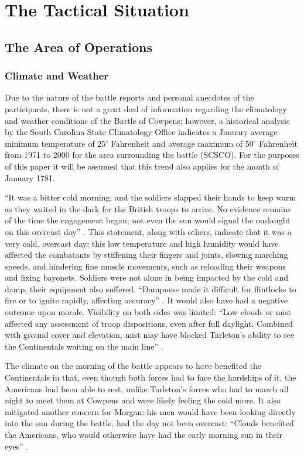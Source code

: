 \section{The Tactical Situation}

\subsection{The Area of Operations}

\subsubsection{Climate and Weather}

Due to the nature of the battle reports and personal anecdotes of the
participants, there is not a great deal of information regarding the
climatology and weather conditions of the Battle of Cowpens; however, a
historical analysis by the South Carolina State Climatology Office indicates a
January average minimum temperature of 25$^\circ$ Fahrenheit and average
maximum of 50$^\circ$ Fahrenheit from 1971 to 2000 for the area surrounding the
battle (SCSCO).  For the purposes of this paper it will be assumed that this
trend also applies for the month of January 1781.

``It was a bitter cold morning, and the soldiers slapped their hands to keep
warm as they waited in the dark for the British troops to arrive.  No evidence
remains of the time the engagement began; not even the sun would signal the
onslaught on this overcast day'' \cite[51]{moncure_cowpens_1996}.  This
statement, along with others, indicate that it was a very cold, overcast day;
this low  temperature and high humidity would have affected the combatants by
stiffening their fingers and joints, slowing marching speeds, and hindering
fine muscle movements, such as reloading their weapons and fixing bayonets.
Soldiers were not alone in being impacted by the cold and damp, their equipment
also suffered.  ``Dampness made it difficult for flintlocks to fire or to
ignite rapidly, affecting accuracy'' \cite[79]{babits_devil_2001}.  It would
also have had a negative outcome upon morale.  Visibility on both sides was
limited: ``Low clouds or mist affected any assessment of troop dispositions,
even after full daylight.  Combined with ground cover and elevation, mist may
have blocked Tarleton's ability to see the Continentals waiting on the main
line'' \cite[80]{babits_devil_2001}.

The climate on the morning of the battle appears to have benefited the
Continentals in that, even though both forces had to face the hardships of it,
the Americans had been able to rest, unlike Tarleton's forces who had to march
all night to meet them at Cowpens and were likely feeling the cold more.  It
also mitigated another concern for Morgan: his men would have been looking
directly into the sun during the battle, had the day not been overcast:
``Clouds benefited the Americans, who would otherwise have had the early
morning sun in their eyes'' \cite[67]{moncure_cowpens_1996}.  

